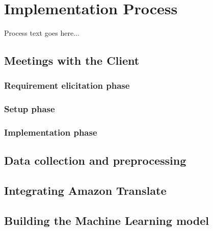 \section{Implementation Process}
Process text goes here...
\subsection{Meetings with the Client}
\subsubsection{Requirement elicitation phase}
\subsubsection{Setup phase}
\subsubsection{Implementation phase}
\subsection{Data collection and preprocessing}
\subsection{Integrating Amazon Translate}
\subsection{Building the Machine Learning model}